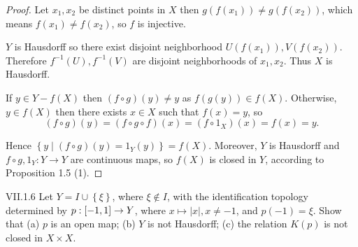 \begin{proof}
	Let \( x_{1}, x_{2} \) be distinct points in \( X \) then \( g(f(x_{1})) \ne g(f(x_{2})) \), which means \( f(x_{1}) \ne f(x_{2}) \), so \( f \) is injective.

	\( Y \) is Hausdorff so there exist disjoint neighborhood \( U(f(x_{1})), V(f(x_{2})) \). Therefore \( f^{-1}(U), f^{-1}(V) \) are disjoint neighborhoods of \( x_{1}, x_{2} \). Thus \( X \) is Hausdorff.

	\bigskip
	If \( y \in Y - f(X) \) then \( (f \circ g)(y) \ne y \) as \( f(g(y)) \in f(X) \). Otherwise, \( y \in f(X) \) then there exists \( x \in X \) such that \( f(x) = y \), so
	\[
		(f \circ g)(y) = (f \circ g \circ f)(x) = (f \circ 1_{X})(x) = f(x) = y.
	\]

	Hence \( \left\{ y \mid (f \circ g)(y) = 1_{Y}(y) \right\} = f(X) \). Moreover, \( Y \) is Hausdorff and \( f\circ g, 1_{Y}: Y \to Y \) are continuous maps, so \( f(X) \) is closed in \( Y \), according to Proposition 1.5 (1).
\end{proof}

\begin{problem}{VII.1.6}
Let \( Y = I \cup \left\{ \xi \right\} \), where \( \xi \notin I \), with the identification topology determined by \( p: \left\lbrack{-1, 1}\right\rbrack \to Y \), where \( x \mapsto \left\vert x \right\vert, x \ne -1 \), and \( p(-1) = \xi \). Show that (a) \( p \) is an open map; (b) \( Y \) is not Hausdorff; (c) the relation \( K(p) \) is not closed in \( X \times X \).
\end{problem}

